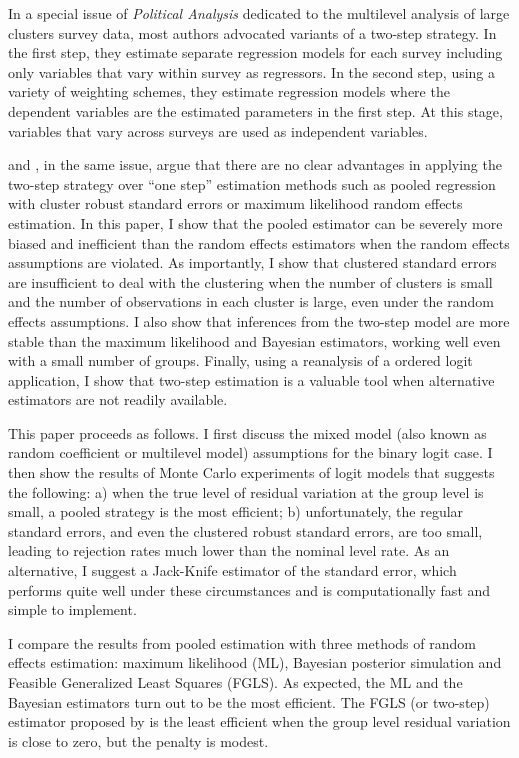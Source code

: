 In a special issue of \textit{Political Analysis} dedicated to the multilevel analysis of large clusters survey data, most authors advocated variants of a two-step strategy. In the first step, they estimate separate regression models for each survey including only variables that vary within survey as regressors. In the second step, using a variety of weighting schemes, they estimate regression models where the dependent variables are the estimated parameters in the first step. At this stage, variables that vary across surveys are used as independent variables.

\citet{franzese:2005} and \citet{beck:2005}, in the same issue, argue that there are no clear advantages  in applying the two-step strategy over ``one step'' estimation methods such as pooled regression with cluster robust standard errors or maximum likelihood random effects estimation. In this paper, I show that the pooled estimator can be severely more biased and inefficient than the random effects estimators when the random effects assumptions are violated. As importantly, I  show that clustered standard errors are insufficient to deal with the clustering when the number of  clusters is small and the number of observations in each cluster is large, even under the random effects assumptions. I also show that inferences from the two-step model are more stable than the maximum likelihood and Bayesian estimators, working well even with a small number of groups. Finally, using a reanalysis of a ordered logit application, I show that two-step estimation is a valuable tool when alternative estimators are not readily available.

This paper proceeds as follows. I first discuss the mixed model (also known as random coefficient or  multilevel model) assumptions for the binary logit case.  I then show the results of Monte Carlo experiments of logit models that suggests the following: a) when the true level of residual variation at the group level is small, a pooled strategy is the most efficient; b) unfortunately, the regular standard errors, and even the clustered robust standard errors, are too small, leading to rejection rates much lower than the nominal level rate.  As an alternative, I suggest a Jack-Knife estimator of the standard error, which performs quite well under these circumstances and is computationally fast and simple to implement.

I compare the results from pooled estimation with three methods of random effects estimation: maximum likelihood (ML),  Bayesian posterior simulation and Feasible Generalized Least Squares (FGLS). As expected, the ML and the Bayesian  estimators turn out to be the most efficient. The FGLS (or two-step) estimator proposed by \citet{hanushek:1974} is the least efficient when the group level residual variation is close to zero, but  the penalty is modest.

